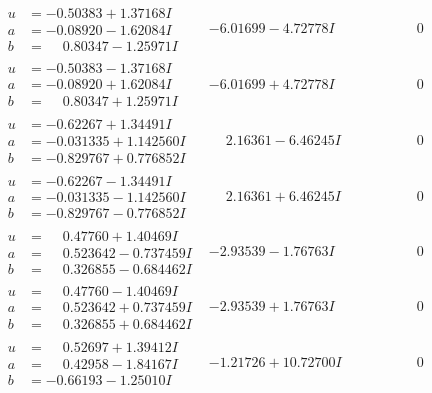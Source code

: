 \documentclass[1p]{elsarticle_modified}
\theoremstyle{definition}
\begin{document}
$$\begin{array}{c|c|c}
\begin{aligned}
u &= -0.50383 + 1.37168 I \\
a &= -0.08920 - 1.62084 I \\
b &= \phantom{-}0.80347 - 1.25971 I\end{aligned}
 & -6.01699 - 4.72778 I & \phantom{-0.000000 } 0 \\ \hline\begin{aligned}
u &= -0.50383 - 1.37168 I \\
a &= -0.08920 + 1.62084 I \\
b &= \phantom{-}0.80347 + 1.25971 I\end{aligned}
 & -6.01699 + 4.72778 I & \phantom{-0.000000 } 0 \\ \hline\begin{aligned}
u &= -0.62267 + 1.34491 I \\
a &= -0.031335 + 1.142560 I \\
b &= -0.829767 + 0.776852 I\end{aligned}
 & \phantom{-}2.16361 - 6.46245 I & \phantom{-0.000000 } 0 \\ \hline\begin{aligned}
u &= -0.62267 - 1.34491 I \\
a &= -0.031335 - 1.142560 I \\
b &= -0.829767 - 0.776852 I\end{aligned}
 & \phantom{-}2.16361 + 6.46245 I & \phantom{-0.000000 } 0 \\ \hline\begin{aligned}
u &= \phantom{-}0.47760 + 1.40469 I \\
a &= \phantom{-}0.523642 - 0.737459 I \\
b &= \phantom{-}0.326855 - 0.684462 I\end{aligned}
 & -2.93539 - 1.76763 I & \phantom{-0.000000 } 0 \\ \hline\begin{aligned}
u &= \phantom{-}0.47760 - 1.40469 I \\
a &= \phantom{-}0.523642 + 0.737459 I \\
b &= \phantom{-}0.326855 + 0.684462 I\end{aligned}
 & -2.93539 + 1.76763 I & \phantom{-0.000000 } 0 \\ \hline\begin{aligned}
u &= \phantom{-}0.52697 + 1.39412 I \\
a &= \phantom{-}0.42958 - 1.84167 I \\
b &= -0.66193 - 1.25010 I\end{aligned}
 & -1.21726 + 10.72700 I & \phantom{-0.000000 } 0 \\ \hline\begin{aligned}

\end{aligned}
\end{array}$$
\end{document}
